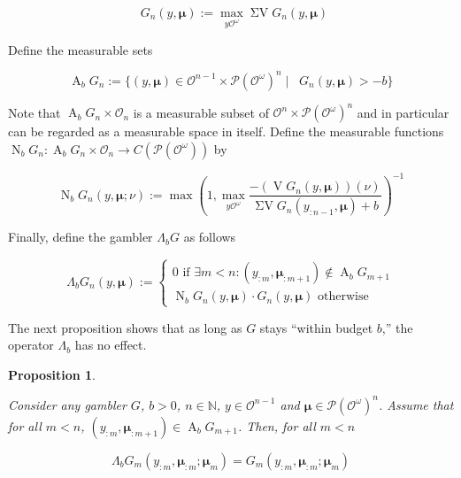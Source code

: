 \documentclass[11pt]{article}
\theoremstyle{definition}
\theoremstyle{plain}
\newtheorem{proposition}{Proposition}%
\newcommand{\Nats}{\mathbb{N}}
\newcommand{\PM}{\mathcal{P}}
\newcommand{\Ob}{\mathcal{O}}
\newcommand{\OO}{\Ob^\omega}
\newcommand{\PMO}{\PM(\OO)}
\DeclareMathOperator{\V}{V}
\DeclareMathOperator{\SV}{\Sigma V}
\DeclareMathOperator{\SVM}{\Sigma V_{\min}}
\DeclareMathOperator{\SVX}{\Sigma V_{\max}}
\DeclareMathOperator{\Ab}{A}
\DeclareMathOperator{\Nr}{N}
\newcommand{\Bd}{\Lambda}
\newcommand{\BM}{\bm{\mu}}
\begin{document}
\begin{equation}
\SVX G_n\left(y,\BM\right) := \max_{y\OO}{\SV G_n\left(y,\BM\right)}
\end{equation}

Define the measurable sets

\begin{equation}
\Ab_b G_n:=\{\left(y,\BM\right) \in \Ob^{n-1} \times \PMO^n \mid \SVM G_n\left(y,\BM\right) > -b\}
\end{equation}

Note that $\Ab_b G_n \times \Ob_n$ is a measurable subset of $\Ob^n \times \PMO^n$ and in particular can be regarded as a measurable space in itself. Define the measurable functions $\Nr_b G_n: \Ab_b G_n \times \Ob_n \rightarrow C\left(\PMO\right)$ by

\begin{equation}
\Nr_b G_n\left(y,\BM;\nu\right):=\max\left(1,\max_{y\OO} \frac{-\left(\V G_n\left(y,\BM\right)\right)\left(\nu\right)}{\SV G_n\left(y_{:n-1},\BM\right)+b}\right)^{-1}
\end{equation}

Finally, define the gambler $\Bd_b G$ as follows

\begin{equation}
\Bd_b G_n\left(y,\BM\right):=\begin{cases} 0 \text{ if } \exists m < n: \left(y_{:m},\BM_{:m+1}\right) \not\in \Ab_b G_{m+1} \\ \Nr_b G_n\left(y,\BM\right) \cdot G_n\left(y, \BM\right) \text{ otherwise} \end{cases}
\end{equation}

The next proposition shows that as long as $G$ stays \enquote{within budget $b$,} the operator $\Bd_b$ has no effect. 

\begin{proposition}
\label{prp:b_no_effect}

Consider any gambler $G$, $b > 0$, $n \in \Nats$, $y \in \Ob^{n - 1}$ and $\BM \in \PMO^n$. Assume that for all $m < n$, $\left(y_{:m},\BM_{:m+1}\right) \in \Ab_b G_{m+1}$. Then, for all $m < n$

\begin{equation}
\Bd_b G_m\left(y_{:m},\BM_{:m};\BM_m\right)=G_m\left(y_{:m},\BM_{:m};\BM_m\right)
\end{equation}

\end{proposition}
\end{document}
